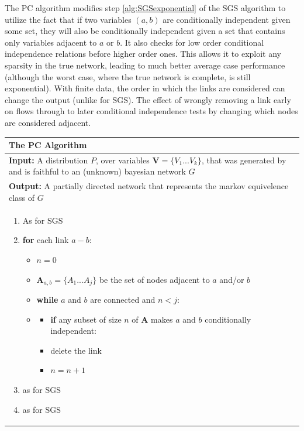 \documentclass[11pt,a4paper,oneside]{book}
\begin{document}
The PC algorithm \cite{Sprites} modifies step \ref{alg:SGSexponential} of the SGS algorithm to utilize the fact that if two variables $(a,b)$ are conditionally independent given some set, they will also be conditionally independent given a set that contains only variables adjacent to $a$ or $b$. It also checks for low order conditional independence relations before higher order ones. This allows it to exploit any sparsity in the true network, leading to much better average case performance  \cite{Sprites} (although the worst case, where the true network is complete, is still exponential). With finite data, the order in which the links are considered can change the output (unlike for SGS). The effect of wrongly removing a link early on flows through to later conditional independence tests by changing which nodes are considered adjacent.


\begin{table}[H]
 \begin{tabularx}{\textwidth}{X}
 \hline
\rule{0pt}{2.5ex} 
 \textbf{The PC Algorithm}\\
 \hline
 \rule{0pt}{2.5ex}
\textbf{Input:} A distribution $P$, over variables $\boldsymbol{V} = \{V_{1}...V_{k}\}$, that was generated by and is faithful to an (unknown) bayesian network $G$\\
\textbf{Output:} A partially directed network that represents the markov equivelence class of $G$\\
 \begin{enumerate}[itemsep=8pt]
  \item As for SGS
  \item \textbf{for} each link $a-b$:
  \begin{itemize}[label={}]
   \item $n = 0$
   \item $\boldsymbol{A}_{a,b} = \{A_{1}...A_{j}\}$ be the set of nodes adjacent to $a$ and/or $b$
   \item \textbf{while} $a$ and $b$ are connected and $n < j$:
   \item 
    	\begin{itemize}[label={}]
    	\item \textbf{if} any subset of size $n$ of $\boldsymbol{A}$ makes $a$ and $b$ conditionally independent:
    	\item \begin{itemize}[label={}]
    			delete the link
    		  \end{itemize}
    	
    	\item $n = n+1$
    	\end{itemize}
  \end{itemize}   
  \item as for SGS
  \item as for SGS
\end{enumerate}\\
 \hline
\end{tabularx}
\end{table}
\end{document}
